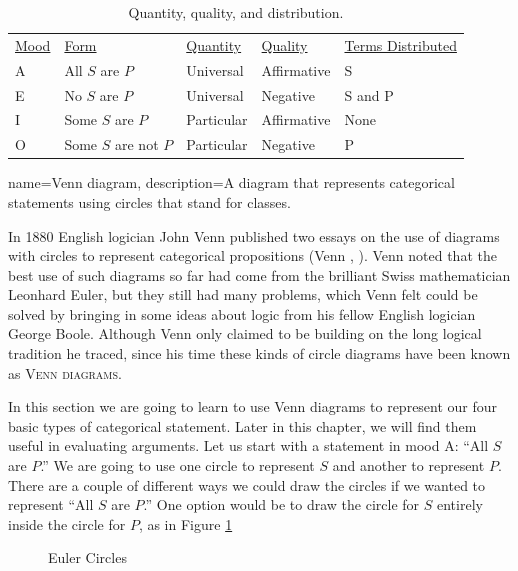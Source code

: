 \begin{table}[b]
\begin{mdframed}[style=mytablebox]
\begin{tabu}{p{.1\linewidth}p{.2\linewidth}p{.15\linewidth}p{.15\linewidth}p{.4\linewidth}}
 \underline{Mood} & \underline{Form} &  \underline{Quantity} & \underline{Quality} & \underline{Terms Distributed} \\
A & All $S$ are $P$ & Universal &  Affirmative & S\\
E & No $S$ are $P$ & Universal & Negative & S and P\\
I & Some $S$ are $P$ & Particular & Affirmative & None\\
O &Some $S$ are not $P$ & Particular &Negative & P \\
\end{tabu}
\end{mdframed}
\caption{Quantity, quality, and distribution.}\label{tab:quantity}
\end{table}

{
name=Venn diagram,
description={A diagram that represents categorical statements using circles that stand for classes.}
}


In 1880 English logician John Venn published two essays on the use of diagrams with circles to represent categorical propositions (Venn \cite*{Venn1880a}, \cite*{Venn1880b}). Venn noted that the best use of such diagrams so far had come from the brilliant Swiss mathematician Leonhard Euler, but they still had many problems, which Venn felt could be solved by bringing in some ideas about logic from his fellow English logician George Boole. Although Venn only claimed to be building on the long logical tradition he traced, since his time these kinds of circle diagrams have been known as \textsc{\glspl{Venn diagram}}.

In this section we are going to learn to use Venn diagrams to represent our four basic types of categorical statement. Later in this chapter, we will find them useful in evaluating arguments. Let us start with a statement in mood A: ``All $S$ are $P$.'' We are going to use one circle to represent $S$ and another to represent $P$. There are a couple of different ways we could draw the circles if we wanted to represent ``All $S$ are $P$.'' One option would be to draw the circle for $S$ entirely inside the circle for $P$, as in Figure \ref{fig:euler_circles}

\begin{figure}
\begin{mdframed}[style=mytablehalfbox]
\begin{center}
\end{center}
\end{mdframed}
\caption{Euler Circles} \label{fig:euler_circles}
\end{figure}

